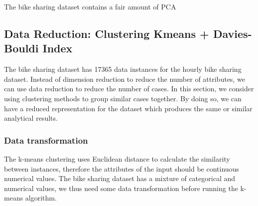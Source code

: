 \documentclass[12pt]{article}
\begin{document}
	The bike sharing dataset contains a fair amount of PCA
	
	\subsection{Data Reduction: Clustering Kmeans + Davies-Bouldi Index}
	\label{data-reduction}
	
	The bike sharing dataset has  17365 data instances for the hourly bike sharing dataset. Instead of dimension reduction to reduce the number of attributes, we can use data reduction to reduce the number of cases. In this section, we consider using clustering methods to group similar cases together. By doing so, we can have a reduced representation for the dataset which produces the same or similar analytical results.
	\subsubsection{Data transformation}
	The k-means clustering uses Euclidean distance to calculate the similarity between instances, therefore the attributes of the input should be continuous numerical values. The bike sharing dataset has a mixture of categorical and numerical values, we thus need some data transformation before running the k-means algorithm.
	
\end{document}
